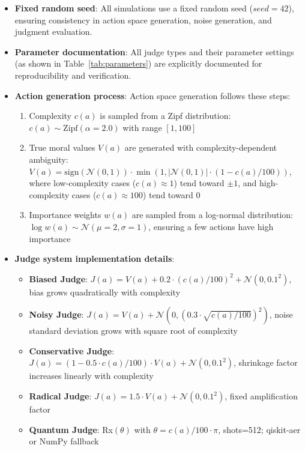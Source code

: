 \documentclass[12pt,a4paper]{article}
\theoremstyle{definition}
\theoremstyle{remark}
\begin{document}
\begin{itemize}
    \item \textbf{Fixed random seed}: All simulations use a fixed random seed ($seed = 42$), ensuring consistency in action space generation, noise generation, and judgment evaluation.
    \item \textbf{Parameter documentation}: All judge types and their parameter settings (as shown in Table~\ref{tab:parameters}) are explicitly documented for reproducibility and verification.
    \item \textbf{Action generation process}: Action space generation follows these steps:
    \begin{enumerate}
        \item Complexity $c(a)$ is sampled from a Zipf distribution: $c(a) \sim \text{Zipf}(\alpha=2.0)$ with range $[1, 100]$
        \item True moral values $V(a)$ are generated with complexity-dependent ambiguity: $V(a) = \text{sign}(\mathcal{N}(0,1)) \cdot \min(1, |\mathcal{N}(0,1)| \cdot (1 - c(a)/100))$, where low-complexity cases ($c(a) \approx 1$) tend toward $\pm 1$, and high-complexity cases ($c(a) \approx 100$) tend toward $0$
        \item Importance weights $w(a)$ are sampled from a log-normal distribution: $\log w(a) \sim \mathcal{N}(\mu=2, \sigma=1)$, ensuring a few actions have high importance
    \end{enumerate}
    \item \textbf{Judge system implementation details}:
    \begin{itemize}
        \item \textbf{Biased Judge}: $J(a) = V(a) + 0.2 \cdot (c(a)/100)^2 + \mathcal{N}(0, 0.1^2)$, bias grows quadratically with complexity
        \item \textbf{Noisy Judge}: $J(a) = V(a) + \mathcal{N}(0, (0.3 \cdot \sqrt{c(a)/100})^2)$, noise standard deviation grows with square root of complexity
        \item \textbf{Conservative Judge}: $J(a) = (1 - 0.5 \cdot c(a)/100) \cdot V(a) + \mathcal{N}(0, 0.1^2)$, shrinkage factor increases linearly with complexity
        \item \textbf{Radical Judge}: $J(a) = 1.5 \cdot V(a) + \mathcal{N}(0, 0.1^2)$, fixed amplification factor
        \item \textbf{Quantum Judge}: Rx$(\theta)$ with $\theta = c(a)/100 \cdot \pi$, shots=512; qiskit-aer or NumPy fallback
    \end{itemize}

\end{itemize}
\end{document}
